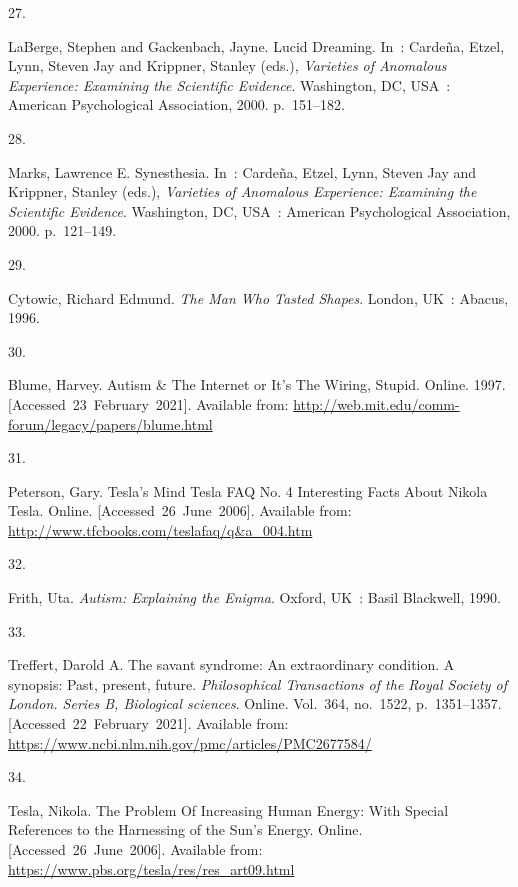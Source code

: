 \documentclass[
  a4paper,
]{article}
\newlength{\cslhangindent}
\newlength{\csllabelwidth}
\newlength{\cslentryspacingunit} %
\newenvironment{CSLReferences}[2] %
 {%
  \setlength{\parindent}{0pt}
  \ifodd #1
  \let\oldpar\par
  \def\par{\hangindent=\cslhangindent\oldpar}
  \fi
  \setlength{\parskip}{#2\cslentryspacingunit}
 }%
 {}
\newcommand{\CSLLeftMargin}[1]{\parbox[t]{\csllabelwidth}{#1}}
\newcommand{\CSLRightInline}[1]{\parbox[t]{\linewidth - \csllabelwidth}{#1}\break}
\begin{document}
\begin{CSLReferences}{0}{0}
\leavevmode{}%
\CSLLeftMargin{27. }%
\CSLRightInline{LaBerge, Stephen and Gackenbach, Jayne. {Lucid
Dreaming}. In~: Cardeña, Etzel, Lynn, Steven Jay and Krippner, Stanley
(eds.), \emph{{Varieties of Anomalous Experience: Examining the
Scientific Evidence}}. Washington, DC, USA~: American Psychological
Association, 2000. p.~151--182. }

\leavevmode{}%
\CSLLeftMargin{28. }%
\CSLRightInline{Marks, Lawrence E. Synesthesia. In~: Cardeña, Etzel,
Lynn, Steven Jay and Krippner, Stanley (eds.), \emph{{Varieties of
Anomalous Experience: Examining the Scientific Evidence}}. Washington,
DC, USA~: American Psychological Association, 2000. p.~121--149. }

\leavevmode{}%
\CSLLeftMargin{29. }%
\CSLRightInline{Cytowic, Richard Edmund. \emph{{The Man Who Tasted
Shapes}}. London, UK~: Abacus, 1996. }

\leavevmode{}%
\CSLLeftMargin{30. }%
\CSLRightInline{Blume, Harvey. {Autism \& The Internet or It's The
Wiring, Stupid}. Online. 1997. {[}Accessed~23~February~2021{]}.
Available from:
\url{http://web.mit.edu/comm-forum/legacy/papers/blume.html}}

\leavevmode{}%
\CSLLeftMargin{31. }%
\CSLRightInline{Peterson, Gary. {Tesla's Mind \textbar{} Tesla FAQ No. 4
\textbar{} Interesting Facts About Nikola Tesla}. Online.
{[}Accessed~26~June~2006{]}. Available from:
\url{http://www.tfcbooks.com/teslafaq/q\&a_004.htm}}

\leavevmode{}%
\CSLLeftMargin{32. }%
\CSLRightInline{Frith, Uta. \emph{{Autism: Explaining the Enigma}}.
Oxford, UK~: Basil Blackwell, 1990. }

\leavevmode{}%
\CSLLeftMargin{33. }%
\CSLRightInline{Treffert, Darold A. The savant syndrome: An
extraordinary condition. A synopsis: Past, present, future.
\emph{Philosophical Transactions of the Royal Society of London. Series
B, Biological sciences}. Online. Vol.~364, no.~1522, p.~1351--1357.
{[}Accessed~22~February~2021{]}. Available from:
\url{https://www.ncbi.nlm.nih.gov/pmc/articles/PMC2677584/}}

\leavevmode{}%
\CSLLeftMargin{34. }%
\CSLRightInline{Tesla, Nikola. {The Problem Of Increasing Human Energy:
With Special References to the Harnessing of the Sun's Energy}. Online.
{[}Accessed~26~June~2006{]}. Available from:
\url{https://www.pbs.org/tesla/res/res_art09.html}}


\end{CSLReferences}
\end{document}
